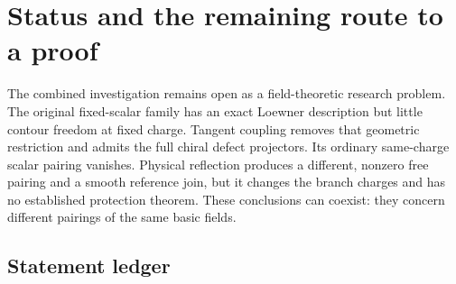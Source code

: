 \section{Status and the remaining route to a proof}\label{sec:outlook}

The combined investigation remains open as a field-theoretic research
problem. The original fixed-scalar family has an exact Loewner
description but little contour freedom at fixed charge. Tangent
coupling removes that geometric restriction and admits the full
chiral defect projectors. Its ordinary same-charge scalar pairing
vanishes. Physical reflection produces a different, nonzero free
pairing and a smooth reference join, but it changes the branch
charges and has no established protection theorem. These conclusions
can coexist: they concern different pairings of the same basic fields.

\subsection{Statement ledger}

